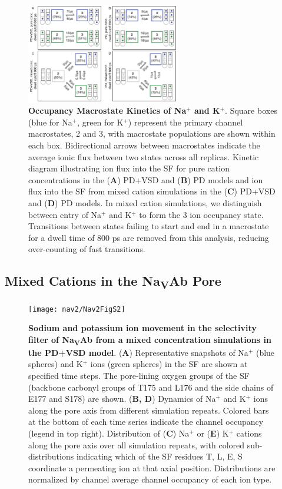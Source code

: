 \begin{refsection}
\begin{figure}[!htb]
\centering
\includegraphics[width=0.6\textwidth]{nav2/Nav2FigS8}
\caption[Occupancy Macrostate Kinetics of Na$^+$ and K$^+$]{\textbf{Occupancy Macrostate Kinetics of Na$^+$ and K$^+$}. Square boxes (blue for Na$^+$, green for K$^+$) represent the primary channel macrostates, 2 and 3, with macrostate populations are shown within each box. Bidirectional arrows between macrostates indicate the average ionic flux between two states across all replicas. Kinetic diagram illustrating ion flux into the SF for pure cation concentrations in the (\textbf{A}) PD+VSD and (\textbf{B}) PD models and ion flux into the SF from mixed cation simulations in the (\textbf{C}) PD+VSD and (\textbf{D}) PD models. In mixed cation simulations, we distinguish between entry of Na$^+$ and K$^+$ to form the 3 ion occupancy state. Transitions between states failing to start and end in a macrostate for a dwell time of 800 ps are removed from this analysis, reducing over-counting of fast transitions.}
\label{fig:nav2figS8}
\end{figure}

\subsection{Mixed Cations in the Na\textsubscript{V}Ab Pore}

\begin{figure}[!htb]
\centering
\texttt{[image: nav2/Nav2FigS2]}
\caption[Sodium and potassium ion movement in the selectivity filter of Na\textsubscript{V}Ab from a mixed concentration simulations in the PD+VSD model]{\textbf{Sodium and potassium ion movement in the selectivity filter of Na\textsubscript{V}Ab from a mixed concentration simulations in the PD+VSD model}. (\textbf{A}) Representative snapshots of Na$^+$ (blue spheres) and K$^+$ ions (green spheres) in the SF are shown at specified time steps. The pore-lining oxygen groups of the SF (backbone carbonyl groups of T175 and L176 and the side chains of E177 and S178) are shown. (\textbf{B, D}) Dynamics of Na$^+$ and K$^+$ ions along the pore axis from different simulation repeats. Colored bars at the bottom of each time series indicate the channel occupancy (legend in top right). Distribution of (\textbf{C}) Na$^+$ or (\textbf{E}) K$^+$ cations along the pore axis over all simulation repeats, with colored sub-distributions indicating which of the SF residues T, L, E, S coordinate a permeating ion at that axial position. Distributions are normalized by channel average channel occupancy of each ion type. }
\label{fig:nav2figS2}
\end{figure}


\end{refsection}
